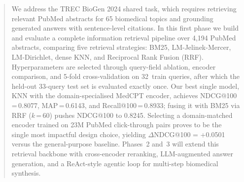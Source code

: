 
\begin{abstract}
We address the TREC BioGen 2024 shared task, which requires retrieving
relevant PubMed abstracts for 65 biomedical topics and grounding
generated answers with sentence-level citations.
In this first phase we build and evaluate a complete information retrieval
pipeline over 4{,}194 PubMed abstracts, comparing five retrieval strategies:
BM25, LM-Jelinek-Mercer, LM-Dirichlet, dense KNN, and Reciprocal Rank
Fusion (RRF).  Hyperparameters are selected through query-field ablation,
encoder comparison, and 5-fold cross-validation on 32~train queries,
after which the held-out 33-query test set is evaluated exactly once.
Our best single model, KNN with the domain-specialised MedCPT encoder,
achieves NDCG@100\,=\,0.8077, MAP\,=\,0.6143, and
Recall@100\,=\,0.8933; fusing it with BM25 via RRF ($k$\,=\,60) pushes
NDCG@100 to 0.8245.
Selecting a domain-matched encoder trained on 23M PubMed click-through
pairs proves to be the single most impactful design choice,
yielding $\Delta$NDCG@100 = +0.0501 versus the general-purpose baseline.
Phases~2 and~3 will extend this retrieval backbone with cross-encoder
reranking, LLM-augmented answer generation, and a ReAct-style agentic
loop for multi-step biomedical synthesis.
\end{abstract}
